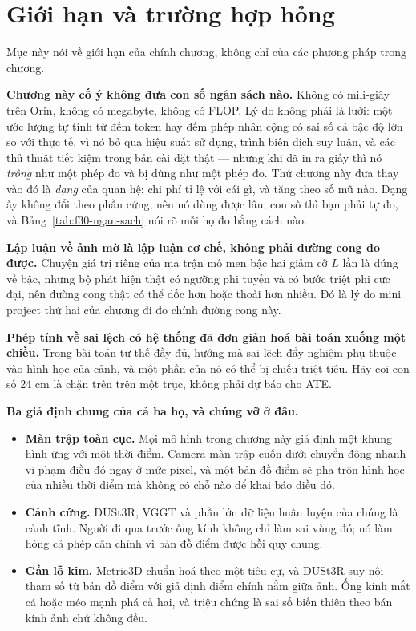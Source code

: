 \documentclass[../../deep_learning.tex]{subfiles}
\begin{document}
\section{Giới hạn và trường hợp hỏng}
Mục này nói về giới hạn của chính chương, không chỉ của các phương pháp trong chương.

\textbf{Chương này cố ý không đưa con số ngân sách nào.} Không có mili-giây trên Orin, không có megabyte, không có FLOP. Lý do không phải là lười: một ước lượng tự tính từ đếm token hay đếm phép nhân cộng có sai số cả bậc độ lớn so với thực tế, vì nó bỏ qua hiệu suất sử dụng, trình biên dịch suy luận, và các thủ thuật tiết kiệm trong bản cài đặt thật --- nhưng khi đã in ra giấy thì nó \emph{trông} như một phép đo và bị dùng như một phép đo. Thứ chương này đưa thay vào đó là \emph{dạng} của quan hệ: chi phí tỉ lệ với cái gì, và tăng theo số mũ nào. Dạng ấy không đổi theo phần cứng, nên nó dùng được lâu; con số thì bạn phải tự đo, và Bảng~\ref{tab:f30-ngan-sach} nói rõ mỗi họ đo bằng cách nào.

\textbf{Lập luận về ảnh mờ là lập luận cơ chế, không phải đường cong đo được.} Chuyện giá trị riêng của ma trận mô men bậc hai giảm cỡ \(L\) lần là đúng về bậc, nhưng bộ phát hiện thật có ngưỡng phi tuyến và có bước triệt phi cực đại, nên đường cong thật có thể dốc hơn hoặc thoải hơn nhiều. Đó là lý do mini project thứ hai của chương đi đo chính đường cong này.

\textbf{Phép tính về sai lệch có hệ thống đã đơn giản hoá bài toán xuống một chiều.} Trong bài toán tư thế đầy đủ, hướng mà sai lệch đẩy nghiệm phụ thuộc vào hình học của cảnh, và một phần của nó có thể bị chiếu triệt tiêu. Hãy coi con số 24 cm là chặn trên trên một trục, không phải dự báo cho ATE.

\textbf{Ba giả định chung của cả ba họ, và chúng vỡ ở đâu.}
\begin{itemize}
\item \textbf{Màn trập toàn cục.} Mọi mô hình trong chương này giả định một khung hình ứng với một thời điểm. Camera màn trập cuốn dưới chuyển động nhanh vi phạm điều đó ngay ở mức pixel, và một bản đồ điểm sẽ pha trộn hình học của nhiều thời điểm mà không có chỗ nào để khai báo điều đó.
\item \textbf{Cảnh cứng.} DUSt3R, VGGT và phần lớn dữ liệu huấn luyện của chúng là cảnh tĩnh. Người đi qua trước ống kính không chỉ làm sai vùng đó; nó làm hỏng cả phép căn chỉnh vì bản đồ điểm được hồi quy chung.
\item \textbf{Gần lỗ kim.} Metric3D chuẩn hoá theo một tiêu cự, và DUSt3R suy nội tham số từ bản đồ điểm với giả định điểm chính nằm giữa ảnh. Ống kính mắt cá hoặc méo mạnh phá cả hai, và triệu chứng là sai số biến thiên theo bán kính ảnh chứ không đều.
\end{itemize}
\end{document}
